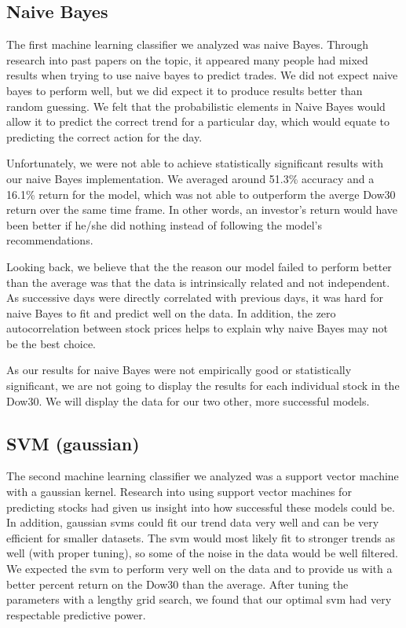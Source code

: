 \documentclass{article}
\begin{document}
\subsection{Naive Bayes}
The first machine learning classifier we analyzed was naive Bayes. Through research into past papers on the topic, it appeared many people had mixed results when trying to use naive bayes to predict trades. We did not expect naive bayes to perform well, but we did expect it to produce results better than random guessing. We felt that the probabilistic elements in Naive Bayes would allow it to predict the correct trend for a particular day, which would equate to predicting the correct action for the day.

Unfortunately, we were not able to achieve statistically significant results with our naive Bayes implementation. We averaged around 51.3\% accuracy and a 16.1\% return for the model, which was not able to outperform the averge Dow30 return over the same time frame. In other words, an investor's return would have been better if he/she did nothing instead of following the model's recommendations.

Looking back, we believe that the the reason our model failed to perform better than the average was that the data is intrinsically related and not independent. As successive days were directly correlated with previous days, it was hard for naive Bayes to fit and predict well on the data. In addition, the zero autocorrelation between stock prices helps to explain why naive Bayes may not be the best choice.

As our results for naive Bayes were not empirically good or statistically significant, we are not going to display the results for each individual stock in the Dow30. We will display the data for our two other, more successful models.

\subsection{SVM (gaussian)}
The second machine learning classifier we analyzed was a support vector machine with a gaussian kernel. Research into using support vector machines for predicting stocks had given us insight into how successful these models could be. In addition, gaussian svms could fit our trend data very well and can be very efficient for smaller datasets. The svm would most likely fit to stronger trends as well (with proper tuning), so some of the noise in the data would be well filtered. We expected the svm to perform very well on the data and to provide us with a better percent return on the Dow30 than the average. After tuning the parameters with a lengthy grid search, we found that our optimal svm had very respectable predictive power.
\end{document}

